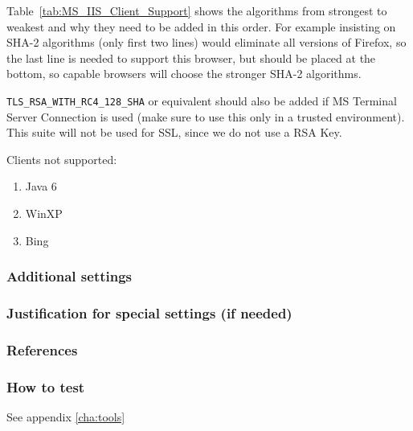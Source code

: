 Table~\ref{tab:MS_IIS_Client_Support} shows the algorithms from
strongest to weakest and why they need to be added in this order. For
example insisting on SHA-2 algorithms (only first two lines) would
eliminate all versions of Firefox, so the last line is needed to
support this browser, but should be placed at the bottom, so capable
browsers will choose the stronger SHA-2 algorithms.

\verb|TLS_RSA_WITH_RC4_128_SHA| or equivalent should also be added if
MS Terminal Server Connection is used (make sure to use this only in a
trusted environment). This suite will not be used for SSL, since we do
not use a RSA Key.




Clients not supported:
\begin{enumerate}
\item Java 6
\item WinXP
\item Bing
\end{enumerate}

\subsubsection{Additional settings}


\subsubsection{Justification for special settings (if needed)}


\subsubsection{References}



\subsubsection{How to test}
See appendix \ref{cha:tools}



